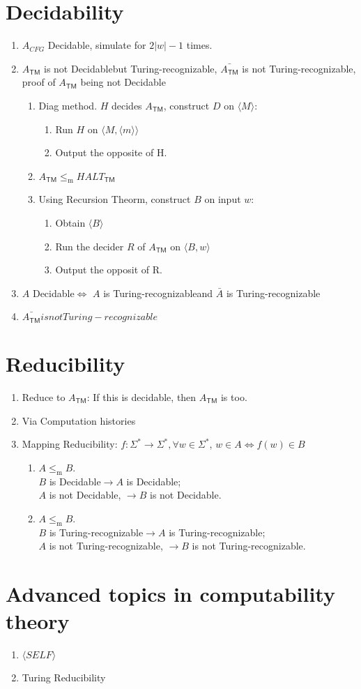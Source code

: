 \documentclass{article}
\newcommand{\TM}{\mathsf{TM}}
\newcommand{\ATM}{A_\TM}
\newcommand{\TR}{Turing-recognizable}
\newcommand{\De}{Decidable}
\newcommand{\U}{\Sigma^*}
\newcommand{\lem}{\leq_\mathrm{m}}
\begin{document}
\section{Decidability}\begin{enumerate}
	\item $A_{CFG}$ \De, simulate for $2|w| - 1$ times.
	\item $\ATM$ is not \De but \TR, $\bar{\ATM}$ is not \TR, proof of $\ATM$ being not \De
	\begin{enumerate}
		\item Diag method. $H$ decides $\ATM$, construct $D$ on $\langle M \rangle$:
		\begin{enumerate}
			\item Run $H$ on $\langle M, \langle m \rangle \rangle$
			\item Output the opposite of H.
		\end{enumerate}
		\item $\ATM \lem HALT_{\TM}$
		\item Using Recursion Theorm, construct $B$ on input $w$:
		\begin{enumerate}
			\item Obtain $\langle B \rangle$
			\item Run the decider $R$ of $\ATM$ on $\langle B, w \rangle$
			\item Output the opposit of R.
		\end{enumerate}
	\end{enumerate}
	\item $A$ \De $\Longleftrightarrow$ $A$ is \TR and $\bar{A}$ is \TR
	\item $\bar{\ATM} is not \TR$
\end{enumerate}


\section{Reducibility}\begin{enumerate}
	\item Reduce to $\ATM$: If this is decidable, then $\ATM$ is too.
	\item Via Computation histories
	\item Mapping Reducibility: $f: \U \rightarrow \U, \forall w \in \U$, $w \in A \Longleftrightarrow f(w) \in B$
	\begin{enumerate}
		\item $A \lem B$.  \\
			 $B$ is \De $\rightarrow A$ is \De;  \\
			$A$ is not \De, $\rightarrow B$ is not \De.
		\item $A \lem B$.  \\
			 $B$ is \TR $\rightarrow A$ is \TR;  \\
			$A$ is not \TR, $\rightarrow B$ is not \TR.
	\end{enumerate}
\end{enumerate}


\section{Advanced topics in computability theory}\begin{enumerate}
	\item $\langle SELF \rangle$
	\item Turing Reducibility
\end{enumerate}
\end{document}
